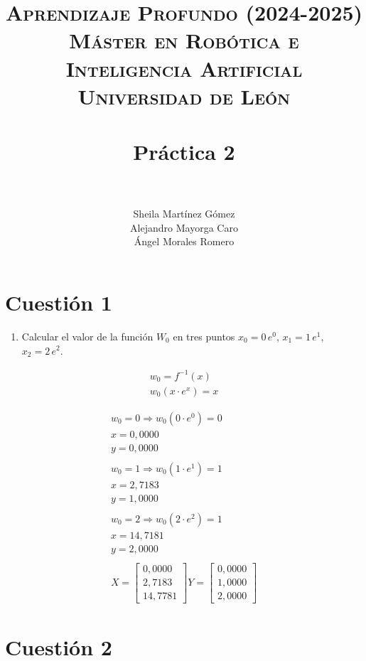 \documentclass[paper=a4, fontsize=11pt]{scrartcl} %
\title{	
\normalfont \normalsize 
\textsc{{\textbf{Aprendizaje Profundo (2024-2025)}} \\ Máster en Robótica e Inteligencia Artificial \\ Universidad de León} \\ [20pt] %
\horrule{0.5pt} \\[0.4cm] %
\huge Práctica 2 \\   %
\horrule{1.5pt} \\[0.2cm] %
}
\author{Sheila Martínez Gómez\\
Alejandro Mayorga Caro\\
Ángel Morales Romero\\
}
\numberwithin{equation}{section} %
\numberwithin{figure}{section} %
\numberwithin{table}{section} %
\begin{document}
\maketitle
\newpage %


\section{Cuestión 1} 

\begin{enumerate}
    \item Calcular el valor de la función \( W_0 \) en tres puntos \( x_0 = 0 \, e^0 \), \( x_1 = 1 \, e^1 \), \( x_2 = 2 \, e^2 \).
\end{enumerate}

\begin{gather*}
    w_0 = f^{-1}(x)\\
    w_0(x \cdot e^{x}) = x
\end{gather*}

\begin{gather*}
    w_0 = 0 \Rightarrow w_0(0 \cdot e^{0}) = 0\\ x=0,0000\\    y= 0,0000\\\\
    w_0 = 1 \Rightarrow w_0(1 \cdot e^{1}) = 1\\x=2,7183\\    y= 1,0000\\\\
    w_0 = 2 \Rightarrow w_0(2 \cdot e^{2}) = 1\\ x=14,7181\\    y= 2,0000\\\\  
X= \begin{bmatrix}
0,0000 \\
2,7183 \\
14,7781
\end{bmatrix}
Y= \begin{bmatrix}
0,0000 \\
1,0000 \\
2,0000
\end{bmatrix}
\end{gather*}


\newpage
\section{Cuestión 2}
\end{document}
